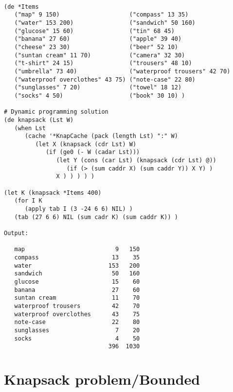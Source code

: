 \begin{verbatim}

(de *Items
   ("map" 9 150)                    ("compass" 13 35)
   ("water" 153 200)                ("sandwich" 50 160)
   ("glucose" 15 60)                ("tin" 68 45)
   ("banana" 27 60)                 ("apple" 39 40)
   ("cheese" 23 30)                 ("beer" 52 10)
   ("suntan cream" 11 70)           ("camera" 32 30)
   ("t-shirt" 24 15)                ("trousers" 48 10)
   ("umbrella" 73 40)               ("waterproof trousers" 42 70)
   ("waterproof overclothes" 43 75) ("note-case" 22 80)
   ("sunglasses" 7 20)              ("towel" 18 12)
   ("socks" 4 50)                   ("book" 30 10) )

# Dynamic programming solution
(de knapsack (Lst W)
   (when Lst
      (cache '*KnapCache (pack (length Lst) ":" W)
         (let X (knapsack (cdr Lst) W)
            (if (ge0 (- W (cadar Lst)))
               (let Y (cons (car Lst) (knapsack (cdr Lst) @))
                  (if (> (sum caddr X) (sum caddr Y)) X Y) )
               X ) ) ) ) )

(let K (knapsack *Items 400)
   (for I K
      (apply tab I (3 -24 6 6) NIL) )
   (tab (27 6 6) NIL (sum cadr K) (sum caddr K)) )

Output:

   map                          9   150
   compass                     13    35
   water                      153   200
   sandwich                    50   160
   glucose                     15    60
   banana                      27    60
   suntan cream                11    70
   waterproof trousers         42    70
   waterproof overclothes      43    75
   note-case                   22    80
   sunglasses                   7    20
   socks                        4    50
                              396  1030

\end{verbatim}

\section*{Knapsack problem/Bounded}

